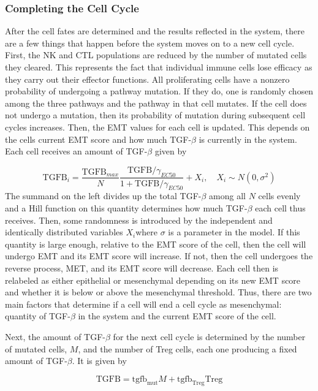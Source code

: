 \documentclass[11pt, preprint]{article}
\begin{document}
\subsubsection{Completing the Cell Cycle}
After the cell fates are determined and the results reflected in the system, there are a few things that happen before the system moves on to a new cell cycle.
First, the NK and CTL populations are reduced by the number of mutated cells they cleared.
This represents the fact that individual immune cells lose efficacy as they carry out their effector functions. 
All proliferating cells have a nonzero probability of undergoing a pathway mutation.
If they do, one is randomly chosen among the three pathways and the pathway in that cell mutates.
If the cell does not undergo a mutation, then its probability of mutation during subsequent cell cycles increases. 
Then, the EMT values for each cell is updated.
This depends on the cells current EMT score and how much TGF-$\beta$ is currently in the system.
Each cell receives an amount of TGF-$\beta$ given by


$$ \text{TGFB}_i = \frac{\text{TGFB}_{max}}{N}\frac{\text{TGFB}/\gamma_{EC50}}{1+\text{TGFB}/\gamma_{EC50}}+ X_i
, \quad X_i \sim N(0,\sigma^2)$$
The summand on the left divides up the total TGF-$\beta$ among all $N$ cells evenly and a Hill function on this quantity determines how much TGF-$\beta$ each cell thus receives.
Then, some randomness is introduced by the independent and identically distributed variables $X_i$where $\sigma$ is a parameter in the model.
If this quantity is large enough, relative to the EMT score of the cell, then the cell will undergo EMT and its EMT score will increase.
If not, then the cell undergoes the reverse process, MET, and its EMT score will decrease.
Each cell then is relabeled as either epithelial or mesenchymal depending on its new EMT score and whether it is below or above the mesenchymal threshold.
Thus, there are two main factors that determine if a cell will end a cell cycle as mesenchymal: quantity of TGF-$\beta$ in the system and the current EMT score of the cell.

Next, the amount of TGF-$\beta$ for the next cell cycle is determined by the number of mutated cells, $M$, and the number of Treg cells, each one producing a fixed amount of TGF-$\beta$. It is given by

$$ \text{TGFB} = \text{tgfb}_{\text{mut}}M + \text{tgfb}_{\text{Treg}}\text{Treg}$$ %
\end{document}
